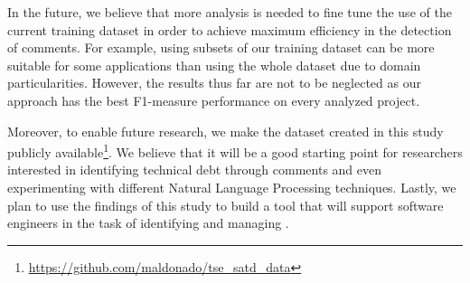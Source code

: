 In the future, we believe that more analysis is needed to fine tune the use of the current training dataset in order to achieve maximum efficiency in the detection of \SATD comments. For example, using subsets of our training dataset can be more suitable for some applications than using the whole dataset due to domain particularities. However, the results thus far are not to be neglected as our approach has the best F1-measure performance on every analyzed project.   


Moreover, to enable future research, we make the dataset created in this study publicly available\footnote{\url{https://github.com/maldonado/tse_satd_data}}. We believe that it will be a good starting point for researchers interested in identifying technical debt through comments and even experimenting with different Natural Language Processing techniques. Lastly, we plan to use the findings of this study to build a tool that will support software engineers in the task of identifying and managing \SATD. 


